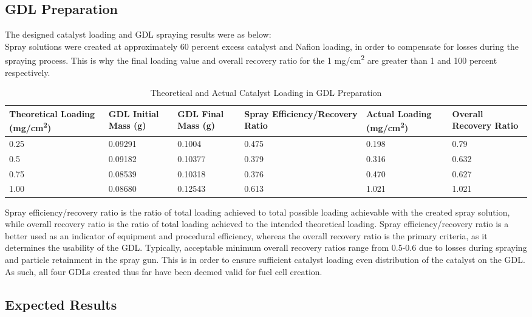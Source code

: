 \documentclass{article}
\begin{document}
	\subsection{GDL Preparation}
	The designed catalyst loading and GDL spraying results were as below:\\
Spray solutions were created at approximately 60 percent excess catalyst and Nafion loading, in order to compensate for losses during the spraying process. This is why the final loading value and overall recovery ratio for the 1 mg/cm\textsuperscript{2} are greater than 1 and 100 percent respectively.

\begin{table}[ht]
\caption{Theoretical and Actual Catalyst Loading in GDL Preparation}
\centering
\noindent\begin{tabularx}{\linewidth}{X|X|X|X|X|X}
\hline
Theoretical Loading (mg/cm\textsuperscript{2}) & GDL Initial Mass (g) & GDL Final Mass (g) & Spray Efficiency/Recovery Ratio & Actual Loading (mg/cm\textsuperscript{2}) & Overall Recovery Ratio \\
\hline
0.25 & 0.09291 & 0.1004 & 0.475 & 0.198 & 0.79\\
\hline
0.5 & 0.09182 & 0.10377 & 0.379 & 0.316 & 0.632\\
\hline
0.75 & 0.08539 & 0.10318 & 0.376 & 0.470 & 0.627\\
\hline
1.00 & 0.08680 & 0.12543 & 0.613 & 1.021 & 1.021\\
\hline
\end{tabularx}
\label{table:gdlload}
\end{table}
Spray efficiency/recovery ratio is the ratio of total loading achieved to total possible loading achievable with the created spray solution, while overall recovery ratio is the ratio of total loading achieved to the intended theoretical loading. Spray efficiency/recovery ratio is a better used as an indicator of equipment and procedural efficiency, whereas the overall recovery ratio is the primary criteria, as it determines the usability of the GDL. Typically, acceptable minimum overall recovery ratios range from 0.5-0.6 due to losses during spraying and particle retainment in the spray gun. This is in order to ensure sufficient catalyst loading even distribution of the catalyst on the GDL. As such, all four GDLs created thus far have been deemed valid for fuel cell creation.
  	\subsection{Expected Results}
\end{document}
